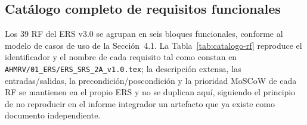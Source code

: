 \documentclass[11pt,a4paper]{article}
\newcommand{\id}[1]{\texttt{#1}}
\begin{document}
\subsection{Catálogo completo de requisitos funcionales}
\label{sec:catalogo-rf}

Los 39 RF del ERS v3.0 se agrupan en seis bloques funcionales, conforme al modelo de casos de uso
de la Sección~4.1. La Tabla~\ref{tab:catalogo-rf} reproduce el identificador y el nombre de cada
requisito tal como constan en \id{AHMRV/01\_ERS/ERS\_SRS\_2A\_v1.0.tex}; la descripción extensa,
las entradas/salidas, la precondición/poscondición y la prioridad MoSCoW de cada RF se mantienen en
el propio ERS y no se duplican aquí, siguiendo el principio de no reproducir en el informe
integrador un artefacto que ya existe como documento independiente.
\end{document}
